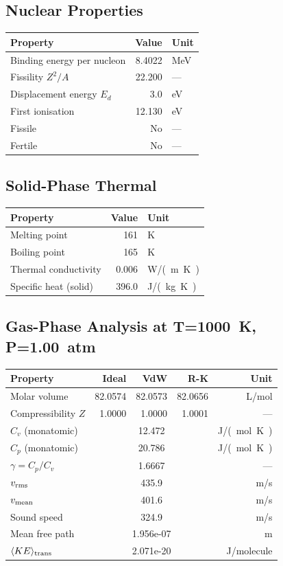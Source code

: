 \documentclass[11pt,a4paper]{article}
\begin{document}
\subsection{Nuclear Properties}
\begin{tabular}{lrl}
  \toprule
  Property & Value & Unit \\
  \midrule
  Binding energy per nucleon & 8.4022 & \si{MeV} \\
  Fissility $Z^2/A$ & 22.200 & --- \\
  Displacement energy $E_d$ & 3.0 & \si{eV} \\
  First ionisation & 12.130 & \si{eV} \\
  Fissile & No & --- \\
  Fertile & No & --- \\
  \bottomrule
\end{tabular}

\subsection{Solid-Phase Thermal}
\begin{tabular}{lrl}
  \toprule
  Property & Value & Unit \\
  \midrule
  Melting point & 161 & \si{K} \\
  Boiling point & 165 & \si{K} \\
  Thermal conductivity & 0.006 & \si{W/(m.K)} \\
  Specific heat (solid) & 396.0 & \si{J/(kg.K)} \\
  \bottomrule
\end{tabular}

\subsection{Gas-Phase Analysis at T=\SI{1000}{K}, P=\SI{1.00}{atm}}
\begin{tabular}{lrrrr}
  \toprule
  Property & Ideal & VdW & R-K & Unit \\
  \midrule
  Molar volume & 82.0574 & 82.0573 & 82.0656 & \si{L/mol} \\
  Compressibility $Z$ & 1.0000 & 1.0000 & 1.0001 & --- \\
  \midrule
  $C_v$ (monatomic) & \multicolumn{3}{c}{12.472} & \si{J/(mol.K)} \\
  $C_p$ (monatomic) & \multicolumn{3}{c}{20.786} & \si{J/(mol.K)} \\
  $\gamma = C_p/C_v$ & \multicolumn{3}{c}{1.6667} & --- \\
  $v_{\rm rms}$ & \multicolumn{3}{c}{435.9} & \si{m/s} \\
  $v_{\rm mean}$ & \multicolumn{3}{c}{401.6} & \si{m/s} \\
  Sound speed & \multicolumn{3}{c}{324.9} & \si{m/s} \\
  Mean free path & \multicolumn{3}{c}{1.956e-07} & \si{m} \\
  $\langle KE \rangle_{\rm trans}$ & \multicolumn{3}{c}{2.071e-20} & \si{J/molecule} \\
  \bottomrule
\end{tabular}
\end{document}

